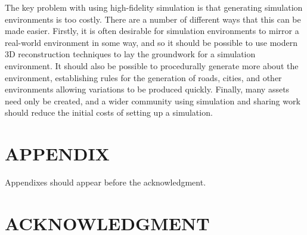 \documentclass[letterpaper, 10 pt, conference]{ieeeconf}  %
\begin{document}
The key problem with using high-fidelity simulation is that generating simulation environments is too costly. There are a number of different ways that this can be made easier. Firstly, it is often desirable for simulation environments to mirror a real-world environment in some way, and so it should be possible to use modern 3D reconstruction techniques to lay the groundwork for a simulation environment. It should also be possible to procedurally generate more about the environment, establishing rules for the generation of roads, cities, and other environments allowing variations to be produced quickly. Finally, many assets need only be created, and a wider community using simulation and sharing work should reduce the initial costs of setting up a simulation.

\addtolength{\textheight}{-12cm}   %







\section*{APPENDIX}

Appendixes should appear before the acknowledgment.

\section*{ACKNOWLEDGMENT}








 
\end{document}
